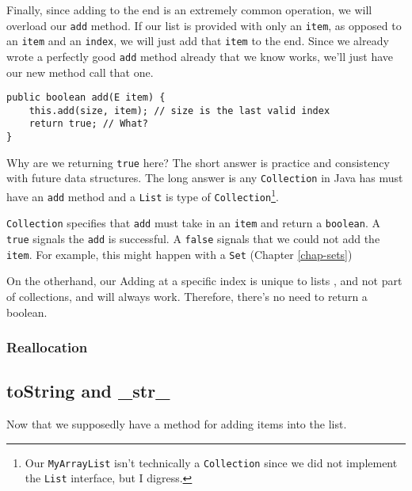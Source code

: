Finally, since adding to the end is an extremely common operation, we will overload our \texttt{add} method.
If our list is provided with only an \texttt{item}, as opposed to an \texttt{item} and an \texttt{index}, we will just add that \texttt{item} to the end.
Since we already wrote a perfectly good \texttt{add} method already that we know works, we'll just have our new method call that one.
\begin{verbatim}
public boolean add(E item) {
	this.add(size, item); // size is the last valid index
	return true; // What?
}
\end{verbatim}

Why are we returning \texttt{true} here?
The short answer is practice and consistency with future data structures.
The long answer is any \texttt{Collection} in Java has must have an \texttt{add} method and a \texttt{List} is type of \texttt{Collection}\footnote{Our \texttt{MyArrayList} isn't technically a \texttt{Collection} since we did not implement the \texttt{List} interface, but I digress.}.

\texttt{Collection} specifies that \texttt{add} must take in an \texttt{item} and return a \texttt{boolean}.
A \texttt{true} signals the \texttt{add} is successful.
A \texttt{false} signals that we could not add the \texttt{item}.
For example, this might happen with a \texttt{Set} (Chapter \ref{chap-sets})


On the otherhand, our Adding at a specific index is unique to lists , and not part of collections,  and will always work. Therefore, there's no need to return a boolean. 

\subsubsection{Reallocation}
\label{arraylist-reallocate}

\subsection{toString and \_str\_}
Now that we supposedly have a method for adding items into the list.


